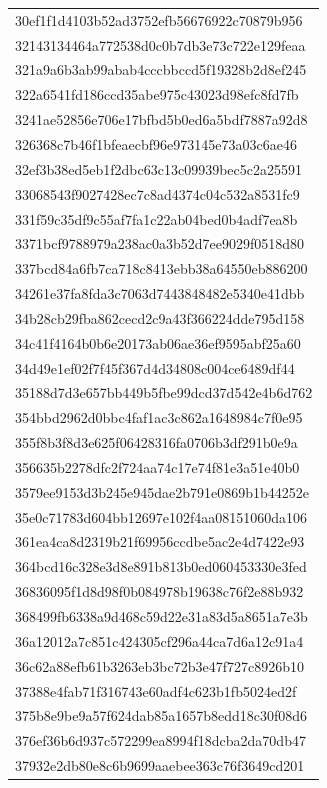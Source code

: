 \begin{tabular}{l}
30ef1f1d4103b52ad3752efb56676922c70879b956 \\
32143134464a772538d0c0b7db3e73c722e129feaa \\
321a9a6b3ab99abab4cccbbccd5f19328b2d8ef245 \\
322a6541fd186ccd35abe975c43023d98efc8fd7fb \\
3241ae52856e706e17bfbd5b0ed6a5bdf7887a92d8 \\
326368c7b46f1bfeaecbf96e973145e73a03c6ae46 \\
32ef3b38ed5eb1f2dbc63c13c09939bec5c2a25591 \\
33068543f9027428ec7c8ad4374c04c532a8531fc9 \\
331f59c35df9c55af7fa1c22ab04bed0b4adf7ea8b \\
3371bcf9788979a238ac0a3b52d7ee9029f0518d80 \\
337bcd84a6fb7ca718c8413ebb38a64550eb886200 \\
34261e37fa8fda3c7063d7443848482e5340e41dbb \\
34b28cb29fba862cecd2c9a43f366224dde795d158 \\
34c41f4164b0b6e20173ab06ae36ef9595abf25a60 \\
34d49e1ef02f7f45f367d4d34808c004ce6489df44 \\
35188d7d3e657bb449b5fbe99dcd37d542e4b6d762 \\
354bbd2962d0bbc4faf1ac3c862a1648984c7f0e95 \\
355f8b3f8d3e625f06428316fa0706b3df291b0e9a \\
356635b2278dfc2f724aa74c17e74f81e3a51e40b0 \\
3579ee9153d3b245e945dae2b791e0869b1b44252e \\
35e0c71783d604bb12697e102f4aa08151060da106 \\
361ea4ca8d2319b21f69956ccdbe5ac2e4d7422e93 \\
364bcd16c328e3d8e891b813b0ed060453330e3fed \\
36836095f1d8d98f0b084978b19638c76f2e88b932 \\
368499fb6338a9d468c59d22e31a83d5a8651a7e3b \\
36a12012a7c851c424305cf296a44ca7d6a12c91a4 \\
36c62a88efb61b3263eb3bc72b3e47f727c8926b10 \\
37388e4fab71f316743e60adf4c623b1fb5024ed2f \\
375b8e9be9a57f624dab85a1657b8edd18c30f08d6 \\
376ef36b6d937c572299ea8994f18dcba2da70db47 \\
37932e2db80e8c6b9699aaebee363c76f3649cd201 \\

\end{tabular}
